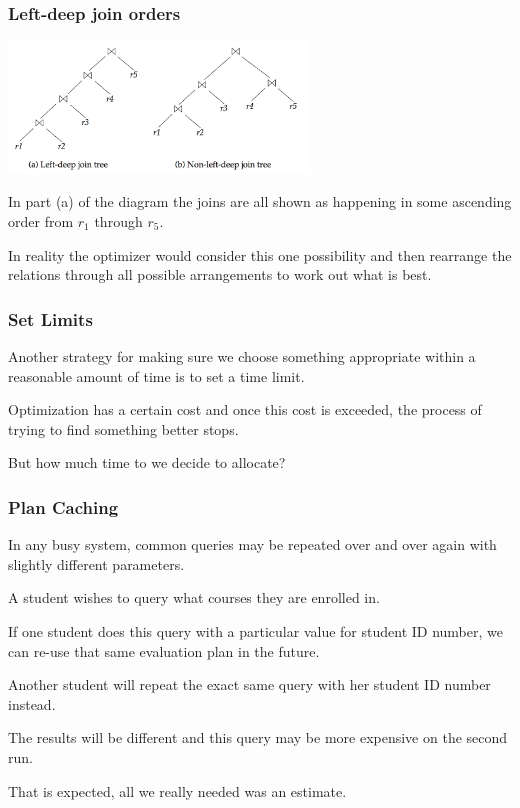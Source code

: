 \begin{frame}
\frametitle{Left-deep join orders}

\begin{center}
	\includegraphics[width=0.6\textwidth]{images/deep-join-tree}
\end{center}

In part (a) of the diagram the joins are all shown as happening in some ascending order  from $r_{1}$ through $r_{5}$.

In reality the optimizer would consider this one possibility and then rearrange the relations through all possible arrangements to work out what is best.

\end{frame}

\begin{frame}
\frametitle{Set Limits}

Another strategy for making sure we choose something appropriate within a reasonable amount of time is to set a time limit. 

Optimization has a certain cost and once this cost is exceeded, the process of trying to find something better stops. 

But how much time to we decide to allocate? 


\end{frame}

\begin{frame}
\frametitle{Plan Caching}

In any busy system, common queries may be repeated over and over again with slightly different parameters. 

A student wishes to query what courses they are enrolled in. 

If one student does this query with a particular value for student ID number, we can re-use that same evaluation plan in the future.

Another student will repeat the exact same query with her student ID number instead.

The results will be different and this query may be more expensive on the second run.

That is expected, all we really needed was an estimate.

\end{frame}








